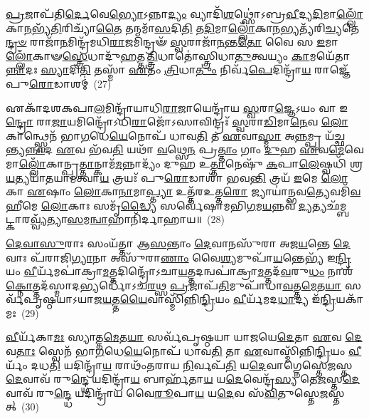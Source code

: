 {\anuvakamend[{\-\ul{𑌏}\-𑌵𑍋\-\ul{𑌪𑍈}\-𑌤𑌮᳴\-\ul{𑌸𑍍𑌮𑌿}\-𑌨𑍍𑌤𑍍𑌰𑌯𑍋᳴𑌦𑌶 𑌚}]}%

\-\ul{𑌪𑍍𑌰}\-𑌜𑌾𑌪᳴𑌤𑌿\-\ul{𑌰𑍍𑌦𑍇}\-𑌵𑍇\-\ul{𑌭𑍍𑌯𑍋}\-\-𑌽𑌨𑍍𑌨𑌾\-\ul{𑌦𑍍𑌯𑌂} 𑌵𑍍𑌯𑌾𑌦𑌿᳴\-\ul{𑌶}\-𑌥𑍍𑌸𑍋॑\-𑌽𑌬𑍍𑌰\-\ul{𑌵𑍀}\-𑌦𑍍𑌯\-\ul{𑌦𑌿}\-𑌮𑌾\-\ul{𑌲𑍍𑌲𑍋𑌁}\-𑌕𑌾\-\ul{𑌨}\-𑌭𑍍𑌯᳴\-\ul{𑌤𑌿}\-𑌰𑌿𑌚𑍍𑌯𑌾᳴\-\ul{𑌤𑍈} 𑌤𑌨𑍍𑌮𑌮𑌾᳴\-\ul{𑌸}\-𑌦𑌿\-\ul{𑌤𑌿} 𑌤\-\ul{𑌦𑌿}\-𑌮𑌾\-\ul{𑌲𑍍𑌲𑍋𑌁}\-𑌕𑌾\-\ul{𑌨}\-𑌭𑍍𑌯𑌤𑍍𑌯᳴𑌰𑌿\-\ul{𑌚𑍍𑌯}\-𑌤𑍇\-\ul{𑌨𑍍𑌦𑍍𑌰}\-\-\ul{𑍞} 𑌰𑌾𑌜𑌾᳴\-\ul{𑌨}\-𑌮𑌿𑌨𑍍𑌦𑍍𑌰᳴𑌮𑌧𑌿\-\ul{𑌰𑌾}\-𑌜𑌮𑌿𑌨𑍍𑌦𑍍𑌰𑍟᳴ \ul{𑌸𑍍𑌵}\-𑌰𑌾𑌜𑌾᳴\-\ul{𑌨}\-𑌨𑍍𑌤\-\ul{𑌤𑍋} 𑌵𑍈 𑌸 \ul{𑌇}\-𑌮𑌾\-\ul{𑌲𑍍𑌲𑍋𑌁}\-𑌕𑌾𑍟\-\ul{𑌸𑍍𑌤𑍍𑌰𑍇}\-𑌧𑌾𑌦𑍁᳴\-\ul{𑌹}\-𑌤𑍍𑌤\-\ul{𑌤𑍍𑌤𑍍𑌰𑌿}\-𑌧𑌾𑌤𑍋॑𑌸𑍍𑌤𑍍𑌰𑌿𑌧𑌾\-\ul{𑌤𑍁}\-𑌤𑍍𑌵𑌯𑍍𑌯𑌂 \ul{𑌕𑌾}\-𑌮𑌯𑍇᳴𑌤𑌾\-\ul{𑌨𑍍𑌨𑌾}\-𑌦𑌃 \ul{𑌸𑍍𑌯𑌾}\-𑌦𑌿\-\ul{𑌤𑌿} 𑌤𑌸𑍍𑌮𑌾᳴ \ul{𑌏}\-𑌤𑌂 \ul{𑌤𑍍𑌰𑌿}\-𑌧𑌾\-\ul{𑌤𑍁𑌂} 𑌨𑌿𑌰𑍍𑌵᳴\-\ul{𑌪𑍇}\-𑌦𑌿𑌨𑍍𑌦𑍍𑌰𑌾᳴\-\ul{𑌯} 𑌰𑌾𑌜𑍍𑌞𑍇᳴ 𑌪𑍁\-\ul{𑌰𑍋}\-𑌡𑌾𑌶𑌮𑍍॑~(27)

𑌏𑌕𑌾᳴\-𑌦𑌶\-𑌕𑌪𑌾\-\ul{𑌲}\-𑌮𑌿𑌨𑍍𑌦𑍍𑌰𑌾᳴𑌯𑌾𑌧𑌿\-\ul{𑌰𑌾}\-𑌜𑌾𑌯𑍇𑌨𑍍𑌦𑍍𑌰𑌾᳴𑌯 \ul{𑌸𑍍𑌵}\-𑌰𑌾\-\ul{𑌜𑍍𑌞𑍇}\-\-𑌽𑌯𑌂 𑌵𑌾 𑌇\-\ul{𑌨𑍍𑌦𑍍𑌰𑍋} 𑌰𑌾\-\ul{𑌜𑌾}\-𑌯𑌮𑌿𑌨𑍍𑌦𑍍𑌰𑍋᳴\-𑌽𑌧𑌿\-\ul{𑌰𑌾}\-𑌜𑍋᳴\-𑌽𑌸𑌾𑌵𑌿𑌨𑍍𑌦𑍍𑌰𑌃᳴ \ul{𑌸𑍍𑌵}\-𑌰𑌾\-\ul{𑌡𑌿}\-𑌮𑌾\-\ul{𑌨𑍇}\-𑌵 \ul{𑌲𑍋}\-𑌕𑌾𑌨𑍍𑌥𑍍𑌸𑍍𑌵𑍇𑌨᳴ 𑌭𑌾\-\ul{𑌗}\-𑌧𑍇\-\ul{𑌯𑍇}\-𑌨𑍋𑌪᳴ 𑌧𑌾𑌵\-\ul{𑌤𑌿} 𑌤 \ul{𑌏}\-𑌵𑌾\-\ul{𑌸𑍍𑌮𑌾} 𑌅\-\ul{𑌨𑍍𑌨}\-𑌮𑍍𑌪𑍍𑌰 𑌯᳴𑌚𑍍𑌛𑌨𑍍𑌤𑍍𑌯\-\ul{𑌨𑍍𑌨𑌾}\-𑌦 \ul{𑌏}\-𑌵 𑌭᳴𑌵\-\ul{𑌤𑌿} 𑌯𑌥𑌾᳴ \ul{𑌵}\-𑌥𑍍𑌸𑍇\-\ul{𑌨} 𑌪𑍍𑌰\-\ul{𑌤𑍍𑌤𑌾𑌂} 𑌗𑌾𑌂 \ul{𑌦𑍁}\-𑌹 \ul{𑌏}\-𑌵\-\ul{𑌮𑍇}\-𑌵𑍇𑌮𑌾\-\ul{𑌲𑍍𑌲𑍋𑌁}\-𑌕𑌾𑌨𑍍𑌪𑍍𑌰\-\ul{𑌤𑍍𑌤𑌾}\-𑌨𑍍𑌕𑌾𑌮᳴\-\ul{𑌮}\-𑌨𑍍𑌨𑌾𑌦𑍍𑌯𑌂᳴ 𑌦𑍁𑌹 𑌉\-\ul{𑌤𑍍𑌤𑌾}\-𑌨𑍇𑌷𑍁᳴ \ul{𑌕}\-𑌪𑌾\-\ul{𑌲𑍇}\-𑌷𑍍𑌵𑌧𑌿᳴ 𑌶𑍍𑌰\-\ul{𑌯}\-𑌤𑍍𑌯𑌯𑌾᳴𑌤𑌯𑌾𑌮𑌤𑍍𑌵𑌾\-\ul{𑌯} 𑌤𑍍𑌰𑌯𑌃᳴ 𑌪𑍁\-\ul{𑌰𑍋}\-𑌡𑌾𑌶𑌾᳴ 𑌭𑌵\-\ul{𑌨𑍍𑌤𑌿} 𑌤𑍍𑌰𑌯᳴ \ul{𑌇}\-𑌮𑍇 \ul{𑌲𑍋}\-𑌕𑌾 \ul{𑌏}\-𑌷𑌾𑌂 \ul{𑌲𑍋}\-𑌕𑌾\-\ul{𑌨𑌾}\-𑌮𑌾\-\ul{𑌪𑍍𑌤𑍍𑌯𑌾} 𑌉𑌤𑍍𑌤᳴𑌰𑌉𑌤𑍍𑌤\-\ul{𑌰𑍋} 𑌜𑍍𑌯𑌾𑌯𑌾॑𑌨𑍍𑌭𑌵\-\ul{𑌤𑍍𑌯𑍇}\-𑌵𑌮𑌿᳴\-\ul{𑌵} 𑌹𑍀𑌮𑍇 \ul{𑌲𑍋}\-𑌕𑌾𑌃 𑌸𑌮𑍃᳴\-\ul{𑌦𑍍𑌧𑍍𑌯𑍈} 𑌸𑌰𑍍𑌵𑍇᳴𑌷𑌾𑌮𑌭𑌿\-\ul{𑌗}\-𑌮\-\ul{𑌯}\-𑌨𑍍𑌨𑌵᳴ \ul{𑌦𑍍𑌯}\-𑌤𑍍𑌯𑌛᳴𑌮𑍍𑌬𑌟𑍍𑌕𑌾𑌰\-\ul{𑌵𑍍𑌵𑍍𑌯𑌁}\-𑌤𑍍𑌯𑌾\-\ul{𑌸}\-𑌮\-\ul{𑌨𑍍𑌵𑌾}\-𑌹𑌾𑌨𑌿᳴𑌰𑍍𑌦𑌾𑌹𑌾𑌯॥~(28)

{\anuvakamend[{\-\ul{𑌪𑍁}\-\-\ul{𑌰𑍋}\-𑌡𑌾\-\ul{𑌶}\-𑌨𑍍𑌤𑍍𑌰\-\ul{𑌯𑌃} 𑌷𑌡𑍍𑌵𑌿𑍞᳴𑌶𑌤𑌿𑌶𑍍𑌚}]}%

\-\ul{𑌦𑍇}\-\-\ul{𑌵𑌾}\-\-\ul{𑌸𑍁}\-𑌰𑌾𑌃 𑌸𑌂𑌯᳴𑌤𑍍𑌤𑌾 𑌆\-\ul{𑌸}\-𑌨𑍍𑌤𑌾𑌂 \ul{𑌦𑍇}\-𑌵𑌾𑌨𑌸𑍁᳴𑌰𑌾 𑌅𑌜\-\ul{𑌯}\-𑌨𑍍𑌤𑍇 \ul{𑌦𑍇}\-𑌵𑌾𑌃 𑌪᳴𑌰𑌾𑌜𑌿\-\ul{𑌗𑍍𑌯𑌾}\-𑌨𑌾 𑌅𑌸𑍁᳴𑌰𑌾\-\ul{𑌣𑌾𑌂} 𑌵𑍈\-\ul{𑌶𑍍𑌯}\-𑌮𑍁𑌪𑌾᳴\-\ul{𑌯}\-𑌨𑍍𑌤𑍇𑌭𑍍𑌯᳴ 𑌇\-\ul{𑌨𑍍𑌦𑍍𑌰𑌿}\-𑌯𑌂 \ul{𑌵𑍀}\-𑌰𑍍𑌯᳴𑌮𑌪𑌾॑𑌕𑍍𑌰𑌾\-\ul{𑌮}\-𑌤𑍍𑌤𑌦𑌿𑌨𑍍𑌦𑍍𑌰𑍋᳴\-𑌽𑌚𑌾\-\ul{𑌯}\-𑌤𑍍𑌤𑌦𑌨𑍍𑌵𑌪𑌾॑𑌕𑍍𑌰𑌾\-\ul{𑌮}\-𑌤𑍍𑌤𑌦᳴\-\ul{𑌵}\-𑌰𑍁\-\ul{𑌧𑌂} 𑌨𑌾𑌶᳴\-\ul{𑌕𑍍𑌨𑍋}\-𑌤𑍍𑌤𑌦᳴𑌸𑍍𑌮𑌾𑌦\-\ul{𑌭𑍍𑌯}\-𑌰𑍍𑌧𑍋᳴\-𑌽𑌚\-\ul{𑌰}\-𑌥𑍍𑌸 \ul{𑌪𑍍𑌰}\-𑌜𑌾𑌪᳴\-\ul{𑌤𑌿}\-𑌮𑍁𑌪𑌾᳴𑌧𑌾\-\ul{𑌵}\-𑌤𑍍𑌤\-\ul{𑌮𑍇}\-𑌤\-\ul{𑌯𑌾} 𑌸𑌰𑍍𑌵᳴𑌪𑍃𑌷𑍍𑌠𑌯𑌾\-𑌽𑌯𑌾𑌜\-\ul{𑌯}\-𑌤𑍍𑌤\-\ul{𑌯𑍈}\-𑌵𑌾𑌸𑍍𑌮𑌿᳴𑌨𑍍𑌨𑌿\-\ul{𑌨𑍍𑌦𑍍𑌰𑌿}\-𑌯𑌂 \ul{𑌵𑍀}\-𑌰𑍍𑌯᳴𑌮𑌦\-\ul{𑌧𑌾}\-𑌦𑍍𑌯 𑌇᳴\-\ul{𑌨𑍍𑌦𑍍𑌰𑌿}\-𑌯𑌕𑌾᳴𑌮𑌃~(29)

\-\ul{𑌵𑍀}\-𑌰𑍍𑌯᳴𑌕𑌾\-\ul{𑌮𑌃} 𑌸𑍍𑌯𑌾𑌤𑍍𑌤\-\ul{𑌮𑍇}\-𑌤\-\ul{𑌯𑌾} 𑌸𑌰𑍍𑌵᳴𑌪𑍃𑌷𑍍𑌠𑌯𑌾 𑌯𑌾𑌜𑌯𑍇\-\ul{𑌦𑍇}\-𑌤𑌾 \ul{𑌏}\-𑌵 \ul{𑌦𑍇}\-𑌵\-\ul{𑌤𑌾𑌃} 𑌸𑍍𑌵𑍇𑌨᳴ 𑌭𑌾\-\ul{𑌗}\-𑌧𑍇\-\ul{𑌯𑍇}\-𑌨𑍋𑌪᳴ 𑌧𑌾𑌵\-\ul{𑌤𑌿} 𑌤𑌾 \ul{𑌏}\-𑌵𑌾𑌸𑍍𑌮𑌿᳴𑌨𑍍𑌨𑌿\-\ul{𑌨𑍍𑌦𑍍𑌰𑌿}\-𑌯𑌂 \ul{𑌵𑍀}\-𑌰𑍍𑌯𑌂᳴ 𑌦𑌧\-\ul{𑌤𑌿} 𑌯𑌦𑌿𑌨𑍍𑌦𑍍𑌰𑌾᳴\-\ul{𑌯} 𑌰𑌾𑌥𑌂᳴𑌤𑌰𑌾𑌯 \ul{𑌨𑌿}\-𑌰𑍍𑌵𑌪᳴\-\ul{𑌤𑌿} 𑌯\-\ul{𑌦𑍇}\-𑌵𑌾𑌗𑍍𑌨𑍇𑌸𑍍𑌤𑍇\-\ul{𑌜}\-𑌸𑍍𑌤\-\ul{𑌦𑍇}\-𑌵𑌾𑌵᳴ 𑌰𑍁\-\ul{𑌨𑍍𑌦𑍍𑌧𑍇} 𑌯𑌦𑌿𑌨𑍍𑌦𑍍𑌰𑌾᳴\-\ul{𑌯} 𑌬𑌾𑌰𑍍\mbox{}𑌹᳴𑌤𑌾\-\ul{𑌯} 𑌯\-\ul{𑌦𑍇}\-𑌵𑍇𑌨𑍍𑌦𑍍𑌰᳴\-\ul{𑌸𑍍𑌯} 𑌤𑍇\-\ul{𑌜}\-𑌸𑍍𑌤\-\ul{𑌦𑍇}\-𑌵𑌾𑌵᳴ 𑌰𑍁\-\ul{𑌨𑍍𑌦𑍍𑌧𑍇} 𑌯𑌦𑌿𑌨𑍍𑌦𑍍𑌰𑌾᳴𑌯 𑌵𑍈\-\ul{𑌰𑍂}\-𑌪𑌾\-\ul{𑌯} 𑌯\-\ul{𑌦𑍇}\-𑌵 𑌸᳴\-\ul{𑌵𑌿}\-𑌤𑍁𑌸𑍍𑌤𑍇\-\ul{𑌜}\-𑌸𑍍𑌤𑌤𑍍~(30)

